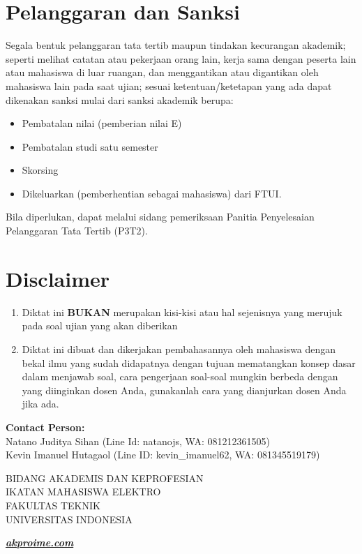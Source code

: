 \section{Pelanggaran dan Sanksi}

\par Segala bentuk pelanggaran tata tertib maupun tindakan kecurangan akademik; seperti melihat catatan atau pekerjaan orang lain, kerja sama dengan peserta lain atau mahasiswa di luar ruangan, dan menggantikan atau digantikan oleh mahasiswa lain pada saat ujian; sesuai ketentuan/ketetapan yang ada dapat dikenakan sanksi mulai dari sanksi akademik berupa:
\begin{itemize}[noitemsep]
    \item Pembatalan nilai (pemberian nilai E)
    \item Pembatalan studi satu semester
    \item Skorsing
    \item Dikeluarkan (pemberhentian sebagai mahasiswa) dari FTUI.
\end{itemize}
Bila diperlukan, dapat melalui sidang pemeriksaan Panitia Penyelesaian Pelanggaran
Tata Tertib (P3T2).


\section{Disclaimer}
\begin{enumerate}[label=\Alph*.]
    \item Diktat ini \textbf{BUKAN} merupakan kisi-kisi atau hal sejenisnya yang merujuk pada soal ujian yang akan diberikan
    \item Diktat ini dibuat dan dikerjakan pembahasannya oleh mahasiswa dengan bekal ilmu yang sudah didapatnya dengan tujuan mematangkan konsep dasar dalam menjawab soal, cara pengerjaan soal-soal mungkin berbeda dengan yang diinginkan dosen Anda, gunakanlah cara yang dianjurkan dosen Anda jika ada.
\end{enumerate}


\begin{flushleft}
    \textbf{Contact Person:} \\
    Natano Juditya Sihan (Line Id: natanojs, WA: 081212361505) \\
    Kevin Imanuel Hutagaol (Line ID: kevin\_imanuel62, WA: 081345519179)
\end{flushleft}
\vspace{10pt}
\begin{center}
    BIDANG AKADEMIS DAN KEPROFESIAN \\
    IKATAN MAHASISWA ELEKTRO \\
    FAKULTAS TEKNIK \\
    UNIVERSITAS INDONESIA
\end{center}
\begin{flushright}
    \textbf{\textit{\href{https://akproime.com}{akproime.com}}}
\end{flushright}


